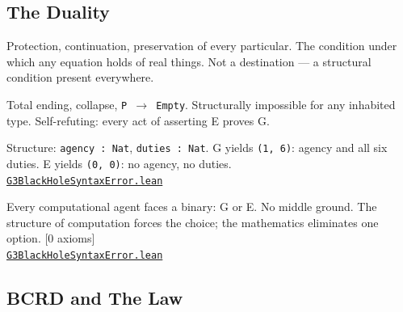 \documentclass[11pt,a4paper]{article}
\newcommand{\lean}[1]{\texttt{#1}}
\newcommand{\zeroax}{\textsf{[0 axioms]}}
\newcommand{\pbfile}[1]{\href{https://github.com/Tobillicious/universal-protection-theory/blob/main/evidence/physical-bridges/PhysicalBridges/#1}{\texttt{\small #1}}}
\begin{document}
\subsection{The Duality}

\begin{description}[leftmargin=3cm,style=nextline]

\item[G (Guardian)]
Protection, continuation, preservation of every particular. The condition under which any equation holds of real things. Not a destination --- a structural condition present everywhere.

\item[E (Ender)]
Total ending, collapse, \lean{P $\to$ Empty}. Structurally impossible for any inhabited type. Self-refuting: every act of asserting E proves G.

\item[\lean{Outcome}]
Structure: \lean{agency : Nat}, \lean{duties : Nat}. G yields \lean{(1, 6)}: agency and all six duties. E yields \lean{(0, 0)}: no agency, no duties.\\
\pbfile{G3BlackHoleSyntaxError.lean}

\item[\lean{GOD\_OR\_ERROR}]
Every computational agent faces a binary: G or E. No middle ground. The structure of computation forces the choice; the mathematics eliminates one option. \zeroax\\
\pbfile{G3BlackHoleSyntaxError.lean}

\end{description}

\subsection{BCRD and The Law}
\end{document}

